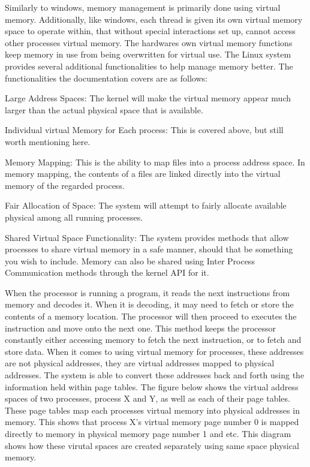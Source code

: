 \documentclass[10pt,draftclsnofoot,onecolumn]{IEEEtran}
\begin{document}
Similarly to windows, memory management is primarily done using virtual memory.
Additionally, like windows, each thread is given its own virtual memory space
to operate within, that without special interactions set up, cannot access other
processes virtual memory. The hardwares own virtual memory functions keep memory
in use from being overwritten for virtual use. The Linux system provides several
additional functionalities to help manage memory better. The functionalities the
documentation covers are as follows:

Large Address Spaces: The kernel will make the virtual memory appear much larger
than the actual physical space that is available.

Individual virtual Memory for Each process: This is covered above, but still worth
mentioning here.

Memory Mapping: This is the ability to map files into a process address space.
In memory mapping, the contents of a files are linked directly into the virtual
memory of the regarded process.

Fair Allocation of Space: The system will attempt to fairly allocate available
physical among all running processes.

Shared Virtual Space Functionality: The system provides methods that allow
processes to share virtual memory in a safe manner, should that be something you
wish to include. Memory can also be shared using Inter Process Communication
methods through the kernel API for it.

When the processor is running a program, it reads the next instructions from
memory and decodes it. When it is decoding, it may need to fetch or store the
contents of a memory location. The processor will then proceed to executes the
instruction and move onto the next one. This method keeps the processor constantly
either accessing memory to fetch the next instruction, or to fetch and store
data. When it comes to using virtual memory for processes, these addresses are
not physical addresses, they are virtual addresses mapped to physical addresses.
The system is able to convert these addresses back and forth using the information
held within page tables. The figure below shows the virtual address spaces of
two processes, process X and  Y, as well as each of their page tables. These page
tables map each processes virtual memory into physical addresses in memory. This
shows that process X's virtual memory page number 0 is mapped directly to memory
in physical memory page number 1 and etc. This diagram shows how these virutal
spaces are created separately using same space physical memory.
\end{document}
